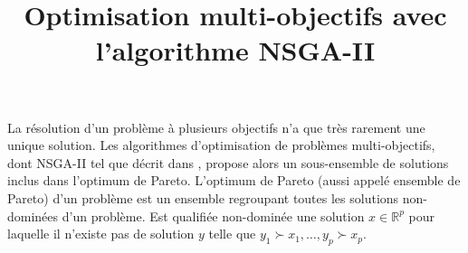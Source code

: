 \documentclass[a4paper, 10pt]{article}
\title{Optimisation multi-objectifs avec l'algorithme NSGA-II}
\author{}
\date{}
\begin{document}
\maketitle

La résolution d'un problème à plusieurs objectifs n'a que très rarement une unique solution. Les algorithmes d'optimisation de problèmes multi-objectifs, dont NSGA-II tel que décrit dans \cite{nsga}, propose  alors un sous-ensemble de solutions inclus dans l'optimum de Pareto. L'optimum de Pareto (aussi appelé ensemble de Pareto) d'un problème est un ensemble regroupant toutes les solutions non-dominées d'un problème. Est qualifiée non-dominée une solution $x\in \mathbb{R}^p$ pour laquelle il n'existe pas de solution $y$ telle que $y_1 \succ x_1, \ldots, y_p \succ x_p$.




 

\end{document}
